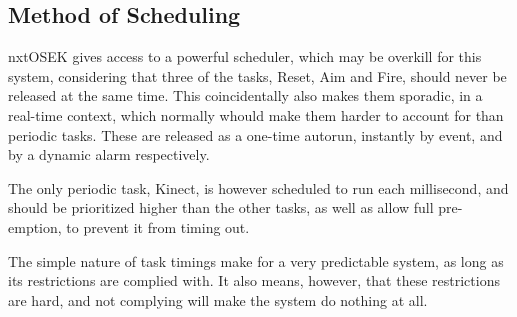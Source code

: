 \subsection{Method of Scheduling}
nxtOSEK gives access to a powerful scheduler, which may be overkill for this system,
considering that three of the tasks, Reset, Aim and Fire, should never be released at
the same time. This coincidentally also makes them sporadic, in a real-time context,
which normally whould make them harder to account for than periodic tasks. These
are released as a one-time autorun, instantly by event, and by a dynamic alarm
respectively.

The only periodic task, Kinect, is however scheduled to run each millisecond, and
should be prioritized higher than the other tasks, as well as allow full pre-emption,
to prevent it from timing out.

The simple nature of task timings make for a very predictable system, as long as its
restrictions are complied with. It also means, however, that these restrictions are
hard, and not complying will make the system do nothing at all.